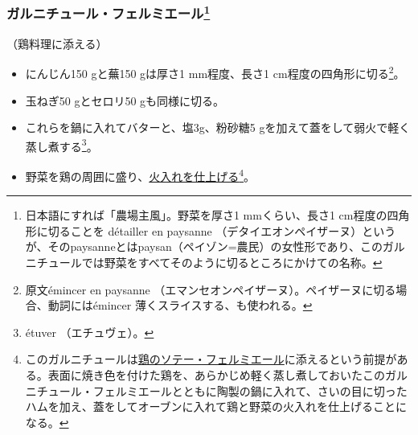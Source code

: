 \begin{recette}
\atoaki{}

\hypertarget{garniture-a-la-fermiere}{%
\subsubsection[ガルニチュール・フェルミエール]{\texorpdfstring{ガルニチュール・フェルミエール\footnote{日本語にすれば「農場主風」。野菜を厚さ1
  mmくらい、長さ1 cm程度の四角形に切ることを détailler en paysanne
  （デタイエオンペイザーヌ）というが、そのpaysanneとはpaysan（ペイゾン=農民）の女性形であり、このガルニチュールでは野菜をすべてそのように切るところにかけての名称。}}{ガルニチュール・フェルミエール}}\label{garniture-a-la-fermiere}}



（鶏料理に添える）

\begin{itemize}
\item
  にんじん150 gと蕪150 gは厚さ1 mm程度、長さ1
  cm程度の四角形に切る\footnote{原文émincer en paysanne
    （エマンセオンペイザーヌ）。ペイザーヌに切る場合、動詞にはémincer
    薄くスライスする、も使われる。}。
\item
  玉ねぎ50 gとセロリ50 gも同様に切る。
\item
  これらを鍋に入れてバターと、塩3g、粉砂糖5
  gを加えて蓋をして弱火で軽く蒸し煮する\footnote{étuver （エチュヴェ）。}。
\item
  野菜を鶏の周囲に盛り、\ul{火入れを仕上げる}\footnote{このガルニチュールは\protect\hyperlink{poulet-saute-a-la-fermiere}{鶏のソテー・フェルミエール}に添えるという前提がある。表面に焼き色を付けた鶏を、あらかじめ軽く蒸し煮しておいたこのガルニチュール・フェルミエールとともに陶製の鍋に入れて、さいの目に切ったハムを加え、蓋をしてオーブンに入れて鶏と野菜の火入れを仕上げることになる。}。
\end{itemize}

\atoaki{}

\hypertarget{garniture-a-la-financiere}{%
}
\end{recette}
